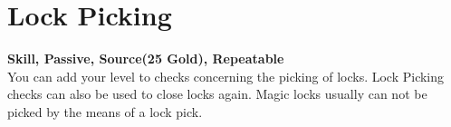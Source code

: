 \section{Lock Picking}\label{sec:lockPicking}
\textbf{Skill, Passive, Source(25 Gold), Repeatable}\\
You can add your level to checks concerning the picking of locks.
Lock Picking checks can also be used to close locks again.
Magic locks usually can not be picked by the means of a lock pick.